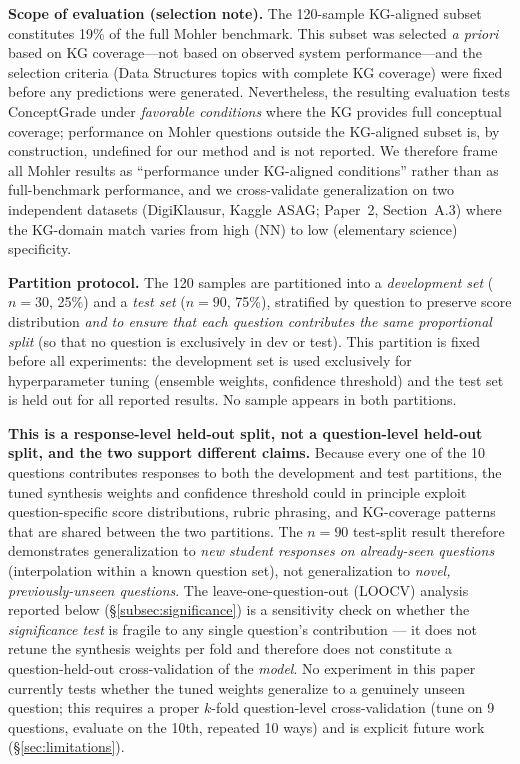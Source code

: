 \documentclass[conference]{IEEEtran}
\begin{document}
\textbf{Scope of evaluation (selection note).} The 120-sample KG-aligned subset
constitutes 19\% of the full Mohler benchmark. This subset was selected
\emph{a priori} based on KG coverage---not based on observed system
performance---and the selection criteria (Data Structures topics with complete
KG coverage) were fixed before any predictions were generated. Nevertheless,
the resulting evaluation tests ConceptGrade under \emph{favorable conditions}
where the KG provides full conceptual coverage; performance on Mohler questions
outside the KG-aligned subset is, by construction, undefined for our method and
is not reported. We therefore frame all Mohler results as ``performance under
KG-aligned conditions'' rather than as full-benchmark performance, and we
cross-validate generalization on two independent datasets (DigiKlausur,
Kaggle ASAG; Paper~2, Section~A.3) where the KG-domain match varies from
high (NN) to low (elementary science) specificity.

\textbf{Partition protocol.} The 120 samples are partitioned into a \emph{development
set} ($n = 30$, 25\%) and a \emph{test set} ($n = 90$, 75\%), stratified by question
to preserve score distribution \emph{and to ensure that each question contributes
the same proportional split} (so that no question is exclusively in dev or test).
This partition is fixed before all experiments:
the development set is used exclusively for hyperparameter tuning (ensemble weights,
confidence threshold) and the test set is held out for all reported results.
No sample appears in both partitions.

\textbf{This is a response-level held-out split, not a question-level
held-out split, and the two support different claims.} Because every one
of the 10 questions contributes responses to both the development and test
partitions, the tuned synthesis weights and confidence threshold could in
principle exploit question-specific score distributions, rubric phrasing,
and KG-coverage patterns that are shared between the two partitions. The
$n=90$ test-split result therefore demonstrates generalization to
\emph{new student responses on already-seen questions} (interpolation
within a known question set), not generalization to \emph{novel,
previously-unseen questions}. The leave-one-question-out (LOOCV) analysis
reported below (\S\ref{subsec:significance}) is a sensitivity check on
whether the \emph{significance test} is fragile to any single question's
contribution --- it does not retune the synthesis weights per fold and
therefore does not constitute a question-held-out cross-validation of the
\emph{model}. No experiment in this paper currently tests whether the
tuned weights generalize to a genuinely unseen question; this requires a
proper $k$-fold question-level cross-validation (tune on 9 questions,
evaluate on the 10th, repeated 10 ways) and is explicit future work
(\S\ref{sec:limitations}).
\end{document}
